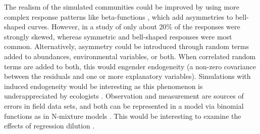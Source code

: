 \documentclass[a4paper,11pt]{article}
\begin{document}
    The realism of the simulated communities could be improved by using more complex response patterns like beta-functions \citep{austin1994determining}, which add asymmetries to bell-shaped curves.
	However, in a study of \citet{Oksanen2002} only about 20\% of the responses were strongly skewed, whereas symmetric and bell-shaped responses were most common. 
	Alternatively, asymmetry could be introduced through random terms added to abundances, environmental variables, or both. \citep[e.g.][]{McCune1997}
	When correlated random terms are added to both, this would engender endogeneity (a non-zero covariance between the residuals and one or more explanatory variables). 
	Simulations with induced endogeneity would be interesting as this phenomenon is underappreciated by ecologists \citep{armsworth2009contrasting, fox2015ecological}.
	Observation and measurement are sources of errors in field data sets, and both can be represented in a model via binomial functions as in N-mixture models \citep{royle2004n}.
    This would be interesting to examine the effects of regression dilution \citep{frost2000correcting, McInerny2011}.
 
\end{document}
